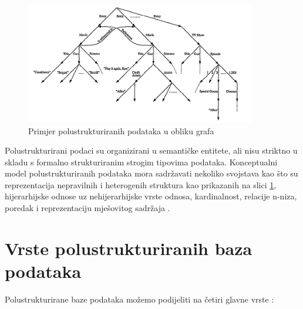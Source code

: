 \documentclass[]{foi}
\begin{document}
\begin{figure}[h!]
	\centering
	\includegraphics[width=0.9\textwidth]{slike/graf_primjer.png}
	\caption{Primjer polustrukturiranih podataka u obliku grafa \cite{buneman1997semistructured}}
	\label{fig:primjer_polustrukturiranih_podataka}
\end{figure}

Polustrukturirani podaci su organizirani u semantičke entitete, ali nisu striktno u skladu s formalno strukturiranim strogim tipovima podataka.
Konceptualni model polustrukturiranih podataka mora sadržavati nekoliko svojstava kao što su reprezentacija nepravilnih i heterogenih struktura
kao prikazanih na slici \ref{fig:primjer_polustrukturiranih_podataka}, hijerarhijske odnose uz nehijerarhijske vrste odnosa, kardinalnost,
relacije n-niza, poredak i reprezentaciju mješovitog sadržaja \cite{ganguly2012evaluations}.

\section{Vrste polustrukturiranih baza podataka}

Polustrukturirane baze podataka možemo podijeliti na četiri glavne vrste \cite{abramova2013nosql}:
\end{document}

